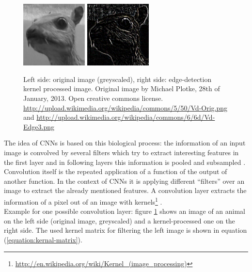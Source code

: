 \documentclass[12pt,twoside]{article}
\theoremstyle{plain}
\theoremstyle{definition}
\theoremstyle{remark}
\begin{document}
\begin{figure}
	\centerline{
		\includegraphics[width=0.3\textwidth]{animal-original.png}
		\qquad
		\includegraphics[width=0.3\textwidth]{animal-edge-detection.png}
	}
	{\caption{Left side: original image (greyscaled), right side: edge-detection kernel processed image. Original image by Michael Plotke, 28th of January, 2013. Open creative commons license.
			\protect\url{http://upload.wikimedia.org/wikipedia/commons/5/50/Vd-Orig.png} and \protect\url{http://upload.wikimedia.org/wikipedia/commons/6/6d/Vd-Edge3.png}}\label{fig:animal-edge-detection}}
\end{figure}
The idea of CNNs is based on this biological process: the information of an input image is convolved by several filters which try to extract interesting features in the first layer and in following layers this information is pooled and subsampled \cite{ImangeNetClassificationCNN-Krizhevsky}.
\\
Convolution itself is the repeated application of a function of the output of another function. In the context of CNNs it is applying different \enquote{filters} over an image to extract the already mentioned features. A convolution layer extracts the information of a pixel out of an image with kernels\footnote{\url{http://en.wikipedia.org/wiki/Kernel_(image_processing)}} \cite{ImangeNetClassificationCNN-Krizhevsky}.
\\
Example for one possible convolution layer: figure \ref{fig:animal-edge-detection} shows an image of an animal on the left side (original image, greyscaled) and a kernel-processed one on the right side. The used kernel matrix for filtering the left image is shown in equation (\ref{equation:kernal-matrix}).
\end{document}
